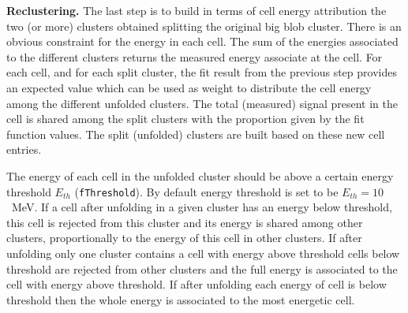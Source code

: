 {\bf Reclustering.} The last step is to build in terms of cell energy attribution the two (or more) clusters obtained splitting the original big blob cluster. There is an obvious constraint for the energy in each cell. The sum of the energies associated to the different clusters returns the measured energy associate at the cell. For each cell, and for each split cluster, the fit result from the previous step provides an expected value which can be used as weight to distribute the cell energy among the different unfolded clusters. The total (measured) signal present in the cell is shared among the split clusters with the proportion given by the fit function values. The split (unfolded) clusters are built based on these new cell entries. 

The energy of each cell in the unfolded cluster should be above a certain energy threshold $E_{th}$ (\texttt{fThreshold}). By default energy threshold is set to be $E_{th}=10$~MeV. If a cell after unfolding in a given cluster has an energy below threshold, this cell is rejected from this cluster and its energy is shared among other clusters, proportionally to the energy of this cell in other clusters. If after unfolding only one cluster contains a cell with energy above threshold cells below threshold are rejected from other clusters and the full energy is associated to the cell with energy above threshold. If after unfolding each energy of cell is below threshold then the whole energy is associated to the most energetic cell.

